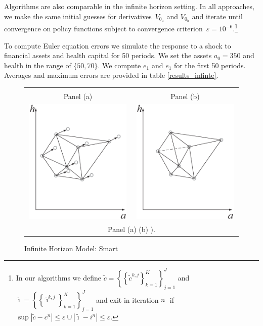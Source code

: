 \documentclass[a4paper,12pt]{article}%
\begin{document}
Algorithms are also comparable in the infinite horizon setting. In all approaches, we make the same initial guesses for derivatives~$V_{0_{a}}$ and $V_{0_{h}}$ and iterate until convergence on policy functions subject to convergence criterion~$\varepsilon=10^{-6}$.\footnote{In our algorithms we define $\tilde{c}=\left\{  \left\{ \tilde{c}^{k,j}\right\}  _{k=1}^{K}\right\}  _{j=1}^{J}$ and $\tilde{\imath}=\left\{  \left\{  \tilde{\imath}^{k,j}\right\}  _{k=1}^{K}\right\}  _{j=1}^{J}$ and exit in iteration $n\,$\ if $\sup|\tilde{c}-c^{n}|\leq\varepsilon\cup|\tilde{\imath}-i^{n}|\leq\varepsilon.$}

To compute Euler equation errors we simulate the response to a shock to financial assets and health capital for 50 periods. We set the assets $a_{0}=350$ and health in the range of $\{50,70\}$. We compute $e_{1}$ and $e_{1}$ for the first 50 periods. Averages and maximum errors are provided in table \ref{results_infinte}.

\begin{figure}[htb] \centering
\caption{Infinite Horizon Model: Smart}
\begin{tabular}
[c]{cc}
& \\
Panel (a) & Panel (b)\\
{\includegraphics[trim=0.000000in 0.000000in -0.005714in 0.003845in, height=6.0319cm, width=7.0226cm]{Abbildungen/Smart_1.eps}} & {\includegraphics[trim=0.000000in 0.000000in 0.000000in 0.000000in, height=6.0319cm, width=7.0226cm]{Abbildungen/Smart_2.eps}} \\
\multicolumn{2}{p{15cm}}{{\footnotesize Panel (a)  (b) ).}}
\end{tabular}
\label{graph_infinte copy(1)}
\end{figure}
\end{document}
